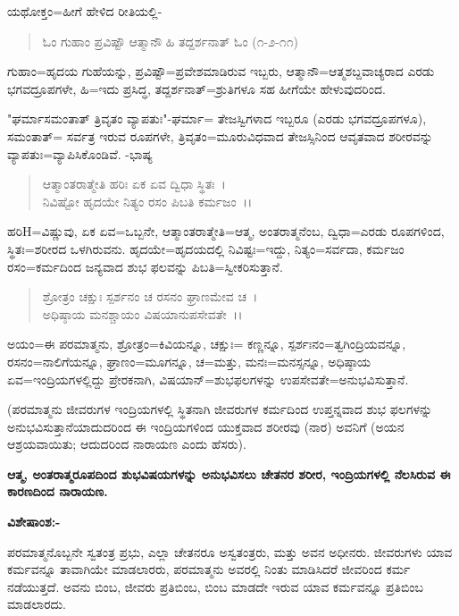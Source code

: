 ಯಥೋಕ್ತಂ=ಹೀಗೆ ಹೇಳಿದ ರೀತಿಯಲ್ಲಿ-

\begin{verse}
ಓಂ ಗುಹಾಂ ಪ್ರವಿಷ್ಟೌ ಆತ್ಮಾನೌ ಹಿ ತದ್ದರ್ಶನಾತ್ ಓಂ (೧-೨-೧೧)
\end{verse}

ಗುಹಾಂ=ಹೃದಯ ಗುಹೆಯನ್ನು, ಪ್ರವಿಷ್ಟೌ=ಪ್ರವೇಶಮಾಡಿರುವ ಇಬ್ಬರು, ಆತ್ಮಾನೌ=ಆತ್ಮಶಬ್ದವಾಚ್ಯರಾದ ಎರಡು ಭಗವದ್ರೂಪಗಳೇ, ಹಿ=ಇದು ಪ್ರಸಿದ್ಧ, ತದ್ದರ್ಶನಾತ್=ಶ್ರುತಿಗಳೂ ಸಹ ಹೀಗೆಯೇ ಹೇಳುವುದರಿಂದ.

"ಘರ್ಮಾಸಮಂತಾತ್ ತ್ರಿವೃತಂ ವ್ಯಾಪತುಃ"-ಘರ್ಮಾ= ತೇಜಸ್ವಿಗಳಾದ ಇಬ್ಬರೂ (ಎರಡು ಭಗವದ್ರೂಪಗಳೂ), ಸಮಂತಾತ್= ಸರ್ವತ್ರ ಇರುವ ರೂಪಗಳೇ, ತ್ರಿವೃತಂ=ಮೂರುವಿಧವಾದ ತೇಜಸ್ಸಿನಿಂದ ಆವೃತವಾದ ಶರೀರವನ್ನು ವ್ಯಾಪತುಃ=ವ್ಯಾಪಿಸಿಕೊಂಡಿವೆ. -ಭಾಷ್ಯ

\begin{verse}
ಆತ್ಮಾಂತರಾತ್ಮೇತಿ ಹರಿಃ ಏಕ ಏವ ದ್ವಿಧಾ ಸ್ಥಿತಃ~।\\ ನಿವಿಷ್ಟೋ ಹೃದಯೇ ನಿತ್ಯಂ ರಸಂ ಪಿಬತಿ ಕರ್ಮಜಂ~।।
\end{verse}


ಹರಿH=ವಿಷ್ಣುವು, ಏಕ ಏವ=ಒಬ್ಬನೇ, ಆತ್ಮಾಂತರಾತ್ಮೇತಿ=ಆತ್ಮ, ಅಂತರಾತ್ಮನೆಂಬ, ದ್ವಿಧಾ=ಎರಡು ರೂಪಗಳಿಂದ, ಸ್ಥಿತಃ=ಶರೀರದ ಒಳಗಿರುವನು. ಹೃದಯೇ=ಹೃದಯದಲ್ಲಿ ನಿವಿಷ್ಟಃ=ಇದ್ದು, ನಿತ್ಯಂ=ಸರ್ವದಾ, ಕರ್ಮಜಂ ರಸಂ=ಕರ್ಮದಿಂದ ಜನ್ಯವಾದ ಶುಭ ಫಲವನ್ನು ಪಿಬತಿ=ಸ್ವೀಕರಿಸುತ್ತಾನೆ.

\begin{verse}
ಶ್ರೋತ್ರಂ ಚಕ್ಷುಃ ಸ್ಪರ್ಶನಂ ಚ ರಸನಂ ಘ್ರಾಣಮೇವ ಚ~।\\ ಅಧಿಷ್ಠಾಯ ಮನಶ್ಚಾಯಂ ವಿಷಯಾನುಪಸೇವತೇ~।।
\end{verse}


ಅಯಂ=ಈ ಪರಮಾತ್ಮನು, ಶ್ರೋತ್ರಂ=ಕಿವಿಯನ್ನೂ, ಚಕ್ಷುಃ= ಕಣ್ಣನ್ನೂ, ಸ್ಪರ್ಶಃನಂ=ತ್ವಗಿಂದ್ರಿಯವನ್ನೂ, ರಸನಂ=ನಾಲಿಗೆಯನ್ನೂ, ಘ್ರಾಣಂ=ಮೂಗನ್ನೂ, ಚ=ಮತ್ತು, ಮನಃ=ಮನಸ್ಸನ್ನೂ, ಅಧಿಷ್ಠಾಯ ಏವ=ಇಂದ್ರಿಯಗಳಲ್ಲಿದ್ದು ಪ್ರೇರಕನಾಗಿ, ವಿಷಯಾನ್=ಶುಭಫಲಗಳನ್ನು ಉಪಸೇವತೇ=ಅನುಭವಿಸುತ್ತಾನೆ.

(ಪರಮಾತ್ಮನು ಜೀವರುಗಳ ಇಂದ್ರಿಯಗಳಲ್ಲಿ ಸ್ಥಿತನಾಗಿ ಜೀವರುಗಳ ಕರ್ಮದಿಂದ ಉಪ್ತನ್ನವಾದ ಶುಭ ಫಲಗಳನ್ನು ಅನುಭವಿಸುತ್ತಾನೆಯಾದುದರಿಂದ ಈ ಇಂದ್ರಿಯಗಳಿಂದ ಯುಕ್ತವಾದ ಶರೀರವು (ನಾರ) ಅವನಿಗೆ (ಅಯನ ಆಶ್ರಯವಾಯಿತು; ಆದುದರಿಂದ ನಾರಾಯಣ ಎಂದು ಹೆಸರು).

\begin{center}
\textbf{ಆತ್ಮ, ಅಂತರಾತ್ಮರೂಪದಿಂದ ಶುಭವಿಷಯಗಳನ್ನು ಅನುಭವಿಸಲು ಚೇತನರ ಶರೀರ, ಇಂದ್ರಿಯಗಳಲ್ಲಿ ನೆಲಸಿರುವ ಈ ಕಾರಣದಿಂದ ನಾರಾಯಣ.}
\end{center}

\noindent
\textbf{ವಿಶೇಷಾಂಶ:-}

ಪರಮಾತ್ಮನೊಬ್ಬನೇ ಸ್ವತಂತ್ರ ಪ್ರಭು, ಎಲ್ಲಾ ಚೇತನರೂ ಅಸ್ವತಂತ್ರರು, ಮತ್ತು ಅವನ ಅಧೀನರು. ಜೀವರುಗಳು ಯಾವ ಕರ್ಮವನ್ನೂ ತಾವಾಗಿಯೇ ಮಾಡಲಾರರು, ಪರಮಾತ್ಮನು ಅವರಲ್ಲಿ ನಿಂತು ಮಾಡಿಸಿದರೆ ಜೀವರಿಂದ ಕರ್ಮ ನಡೆಯುತ್ತದೆ. ಅವನು ಬಿಂಬ, ಜೀವರು ಪ್ರತಿಬಿಂಬ, ಬಿಂಬ ಮಾಡದೇ ಇರುವ ಯಾವ ಕರ್ಮವನ್ನೂ ಪ್ರತಿಬಿಂಬ ಮಾಡಲಾರದು.

